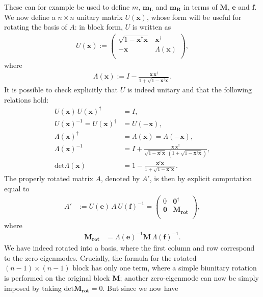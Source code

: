 \documentclass[a4paper,12pt]{article}
\begin{document}
These can for example be used to define $m$, $\mathbf{m_L}$ and $\mathbf{m_R}$ in terms of $\mathbf{M}$, $\mathbf{e}$ and $\mathbf{f}$. We now define a $n\times n$ unitary matrix $U(\mathbf{x})$, whose form will be useful for rotating the basis of $A$: in block form, $U$ is written as
\begin{align}
U(\mathbf{x}):=\begin{pmatrix} \sqrt{1-\mathbf{x}^\dagger\mathbf{x}}& \mathbf{x}^\dagger\\ -\mathbf{x}&\Lambda(\mathbf{x})\\\end{pmatrix},
\end{align}
\noindent
where
\begin{align}
\Lambda(\mathbf{x}):=I-\frac{\mathbf{x}\,\mathbf{x}^\dagger}{1+\sqrt{1-\mathbf{x}^\dagger \mathbf{x}}}.
\end{align}
It is possible to check explicitly that $U$ is indeed unitary and that the following relations hold:
\begin{align}
U(\mathbf{x})\,U(\mathbf{x})^\dagger&=I,\\
U(\mathbf{x})^{-1}=U(\mathbf{x})^\dagger&=U(-\mathbf{x}),\\
\Lambda(\mathbf{x})^\dagger&=\Lambda(\mathbf{x})=\Lambda(-\mathbf{x}),\\
\Lambda(\mathbf{x})^{-1}&=I+\frac{\mathbf{x}\,\mathbf{x}^\dagger}{\sqrt{1-\mathbf{x}^\dagger\mathbf{x}}\;(1+\sqrt{1-\mathbf{x}^\dagger\mathbf{x}})},\\
\mathrm{det}\Lambda(\mathbf{x})&=1-\frac{\mathbf{x}^\dagger \mathbf{x}}{1+\sqrt{1-\mathbf{x}^\dagger\mathbf{x}}}.\label{equation:lambda-det}
\end{align}
The properly rotated matrix $A$, denoted by $A'$, is then by explicit computation equal to
\begin{align}
A'&:=U(\mathbf{e})\,A\,U(\mathbf{f})^{-1}=\begin{pmatrix} 0&\mathbf{0}^\dagger\\ \mathbf{0}& \mathbf{M_{rot}}\\\end{pmatrix},
\end{align}
\noindent
where
\begin{align}
\mathbf{M_{rot}}&=\Lambda(\mathbf{e})^{-1}\mathbf{M}\,\Lambda(\mathbf{f})^{-1}.
\end{align}
We have indeed rotated into a basis, where the first column and row correspond to the zero eigenmodes. Crucially, the formula for the rotated \hbox{$(n-1)\times(n-1)$} block has only one term, where a simple biunitary rotation is performed on the original block $\mathbf{M}$; another zero-eigenmode can now be simply imposed by taking $\mathrm{det}\mathbf{M_{rot}}=0$. But since we now have
\end{document}
